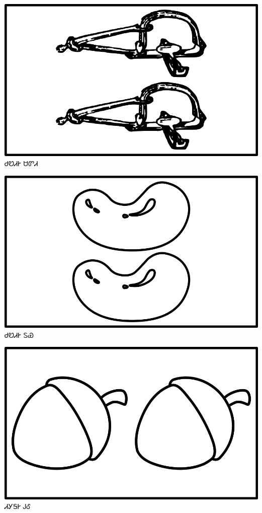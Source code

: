 \documentclass[avery5371]{flashcards}%
\begin{document}
    \begin{flashcard}{
        \includegraphics[width=0.95\columnwidth,height=.51\columnwidth,keepaspectratio]{../artwork/objects-neutral/tali-sadvdi}
    }
        \Huge ᏧᏬᏗᎨ ᏌᏛᏗ
    \end{flashcard}

    \begin{flashcard}{
        \includegraphics[width=0.95\columnwidth,height=.51\columnwidth,keepaspectratio]{../artwork/objects-neutral/tali-tuya}
    }
        \Huge ᏧᏬᏗᎨ ᏚᏯ
    \end{flashcard}

    \begin{flashcard}{
        \includegraphics[width=0.95\columnwidth,height=.51\columnwidth,keepaspectratio]{../artwork/objects-neutral/tali-gule}
    }
        \Huge ᏗᎩᎦᎨ ᎫᎴ
    \end{flashcard}
\end{document}
